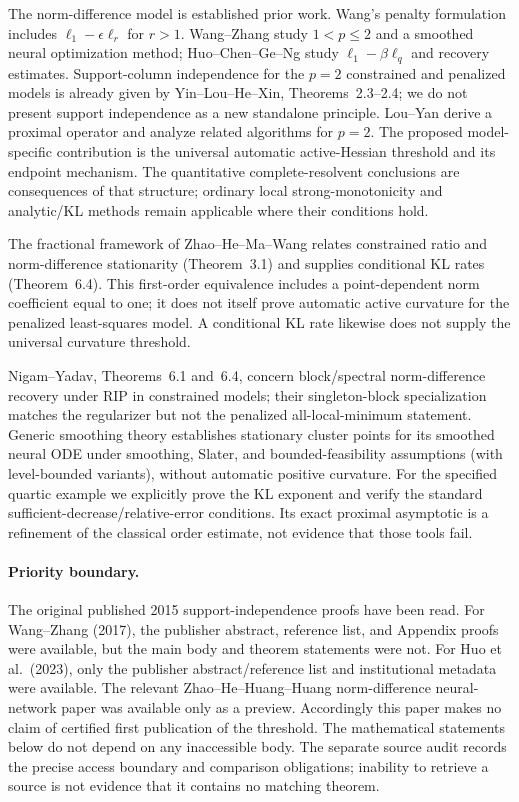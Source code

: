 \documentclass[11pt]{article}
\theoremstyle{remark}\newtheorem{remark}[theorem]{Remark}
\begin{document}
The norm-difference model is established prior work. Wang's penalty
formulation includes $\ell_1-\epsilon\ell_r$ for $r>1$\cite{WangPenalty}.
Wang--Zhang study $1<p\le2$ and a smoothed neural optimization
method\cite{WangZhang}; Huo--Chen--Ge--Ng study
$\ell_1-\beta\ell_q$ and recovery estimates\cite{Huo}.
Support-column independence for the $p=2$ constrained and penalized models
is already given by Yin--Lou--He--Xin, Theorems~2.3--2.4\cite{Yin};
we do not present support independence as a new standalone principle.
Lou--Yan derive a proximal operator and analyze related algorithms for
$p=2$\cite{LouYan}. The proposed model-specific contribution is the
universal automatic active-Hessian threshold and its endpoint mechanism.
The quantitative complete-resolvent conclusions are consequences of
that structure; ordinary local strong-monotonicity and analytic/KL
methods remain applicable where their conditions hold.

The fractional framework of Zhao--He--Ma--Wang\cite{Fractional}
relates constrained ratio and norm-difference stationarity (Theorem~3.1)
and supplies conditional KL rates (Theorem~6.4). This first-order
equivalence includes a point-dependent norm coefficient equal to one;
it does not itself prove automatic active curvature for the penalized
least-squares model. A conditional KL rate likewise does not supply
the universal curvature threshold.

Nigam--Yadav\cite{NigamYadav}, Theorems~6.1 and~6.4, concern
block/spectral norm-difference recovery under RIP in constrained models;
their singleton-block specialization matches the regularizer but not
the penalized all-local-minimum statement. Generic smoothing
theory\cite{BianChen} establishes stationary cluster points for its smoothed
neural ODE under smoothing, Slater, and bounded-feasibility assumptions
(with level-bounded variants), without automatic positive curvature.
For the specified quartic example we explicitly prove the KL exponent
and verify the standard sufficient-decrease/relative-error
conditions\cite{ABS}. Its exact proximal asymptotic is a refinement
of the classical order estimate, not evidence that those tools fail.

\paragraph{Priority boundary.}
The original published 2015 support-independence proofs have been read.
For Wang--Zhang (2017), the publisher abstract, reference list, and
Appendix proofs were available, but the main body and theorem statements
were not. For Huo et al.\ (2023), only the publisher abstract/reference
list and institutional metadata were available. The relevant
Zhao--He--Huang--Huang norm-difference neural-network paper\cite{ZhaoNeural}
was available only as a preview. Accordingly this paper
makes no claim of certified first publication of the threshold. The
mathematical statements below do not depend on any inaccessible body.
The separate source audit records the precise access boundary and
comparison obligations; inability to retrieve a source is not evidence
that it contains no matching theorem.
\end{document}
